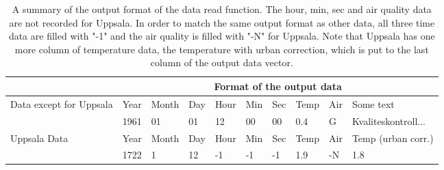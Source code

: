 \begin{table}[H]
\centering

\begin{tabular}{l|lllllllll}
\hline
  & \multicolumn{9}{c}{Format of the output data} \\ \hline\hline
\multirow{2}{1.9cm}{Data except for Uppsala} & Year & Month & Day & Hour & Min & Sec & Temp          & Air & Some text                  \\ \cline{2-10} 
                                         & 1961 & 01    & 01  & 12   & 00  & 00  & 0.4           & G           & Kvaliteskontroll... \\ \hline
\multirow{2}{1.9cm}{Uppsala Data}            & Year & Month & Day & Hour & Min & Sec & Temp & Air & Temp (urban corr.) \\ \cline{2-10} 
                                         & 1722 & 1     & 12  & -1   & -1  & -1  & 1.9           & -N          & 1.8                        \\ \hline
\end{tabular}
\caption{A summary of the output format of the data read function. The hour, min, sec and air quality data are not recorded for Uppsala. In order to match the same output format as other data, all three time data are filled with "-1" and the air quality is filled with "-N" for Uppsala. Note that Uppsala has one more column of temperature data, the temperature with urban correction, which is put to the last column of the output data vector.}
\label{readDataOutPut}
\end{table}


































